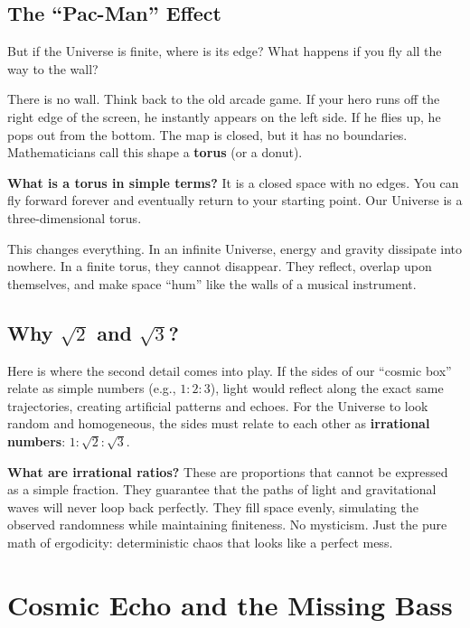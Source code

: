 \documentclass[12pt,a4paper,oneside]{book}
\begin{document}
\section{The “Pac-Man” Effect}

But if the Universe is finite, where is its edge? What happens if you fly all the way to the wall?

There is no wall. Think back to the old arcade game. If your hero runs off the right edge of the screen, he instantly appears on the left side. If he flies up, he pops out from the bottom. The map is closed, but it has no boundaries. Mathematicians call this shape a \textbf{torus} (or a donut).

\textbf{What is a torus in simple terms?} It is a closed space with no edges. You can fly forward forever and eventually return to your starting point. Our Universe is a three-dimensional torus.

This changes everything. In an infinite Universe, energy and gravity dissipate into nowhere. In a finite torus, they cannot disappear. They reflect, overlap upon themselves, and make space “hum” like the walls of a musical instrument.

\section{Why \texorpdfstring{$\sqrt{2}$ and $\sqrt{3}$}{square root of 2 and square root of 3}?}

Here is where the second detail comes into play. If the sides of our “cosmic box” relate as simple numbers (e.g., $1:2:3$), light would reflect along the exact same trajectories, creating artificial patterns and echoes. For the Universe to look random and homogeneous, the sides must relate to each other as \textbf{irrational numbers}: $1 : \sqrt{2} : \sqrt{3}$.

\textbf{What are irrational ratios?} These are proportions that cannot be expressed as a simple fraction. They guarantee that the paths of light and gravitational waves will never loop back perfectly. They fill space evenly, simulating the observed randomness while maintaining finiteness. No mysticism. Just the pure math of ergodicity: deterministic chaos that looks like a perfect mess.

\chapter{Cosmic Echo and the Missing Bass}
\end{document}

